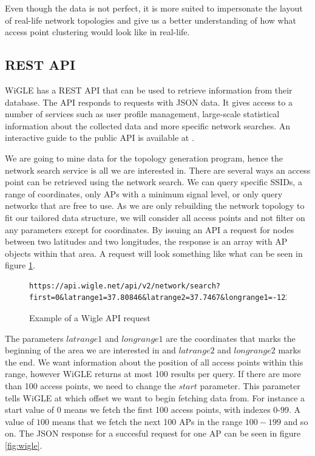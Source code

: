 	Even though the data is not perfect, it is more suited to impersonate the layout of real-life network topologies and give us a better understanding of how what access point
	clustering would look like in real-life. 



	\subsection{REST API}
	WiGLE has a REST API that can be used to retrieve information from their database. The API responds to requests with JSON data. It gives access to a
	number of services such as user profile management, large-scale statistical information about the collected data
	and more specific network searches. An interactive guide to the public API is available at \cite{WigleAPI}. 

	We are going to mine data for the topology generation program, hence the network search service is all we are interested in. There are several ways an access point can be retrieved using
	the network search. We can query specific SSIDs, a range of coordinates, only APs with a minimum signal level, or only query networks that are free to use. As 
	we are only rebuilding the network topology to fit our tailored data structure, we will consider all access points and not filter on any parameters except for coordinates.
	By issuing an API a request for nodes between two latitudes and two longitudes, the response is an array with AP objects within that area.  
	A request will look something like what can be seen in figure \ref{fig:wigReq}.
	\begin{figure}
	\scriptsize
	\begin{lstlisting}[breaklines]
	 https://api.wigle.net/api/v2/network/search?first=0&latrange1=37.80846&latrange2=37.7467&longrange1=-122.5392&longrange2=-122.3813&start=0
	\end{lstlisting}
	\caption{Example of a Wigle API request}
	\label{fig:wigReq}
	\end{figure}

	The parameters $latrange1$ and $longrange1$ are the coordinates that marks the beginning of the area we are interested in and $latrange2$ and $longrange2$ marks the end. 
	We want information about the position of all access points within this range, however WiGLE returns at most 100 results per query. If there are more than 100 access points, we need to change the $start$
	parameter. This parameter tells WiGLE at which offset we want to begin fetching data from. For instance a start value of $0$ means we fetch the first 100 access points, with indexes 0-99. A value of $100$ means that
	we fetch the next 100 APs in the range $100-199$ and so on. The JSON response for a succesful request for one AP can be seen in figure \ref{fig:wigle}. 

